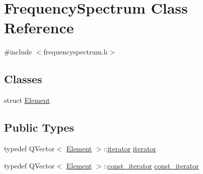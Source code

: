 \hypertarget{class_frequency_spectrum}{}\section{Frequency\+Spectrum Class Reference}
\label{class_frequency_spectrum}


{\ttfamily \#include $<$frequencyspectrum.\+h$>$}

\subsection*{Classes}
\begin{DoxyCompactItemize}
\item 
struct \hyperlink{struct_frequency_spectrum_1_1_element}{Element}
\end{DoxyCompactItemize}
\subsection*{Public Types}
\begin{DoxyCompactItemize}
\item 
typedef Q\+Vector$<$ \hyperlink{struct_frequency_spectrum_1_1_element}{Element} $>$\+::\hyperlink{class_frequency_spectrum_a97c7fc372f25a6caef70041f07e4e1f3}{iterator} \hyperlink{class_frequency_spectrum_a97c7fc372f25a6caef70041f07e4e1f3}{iterator}
\item 
typedef Q\+Vector$<$ \hyperlink{struct_frequency_spectrum_1_1_element}{Element} $>$\+::\hyperlink{class_frequency_spectrum_a7dee82b74b040880feb5a0de2d7ab66b}{const\+\_\+iterator} \hyperlink{class_frequency_spectrum_a7dee82b74b040880feb5a0de2d7ab66b}{const\+\_\+iterator}
\end{DoxyCompactItemize}
